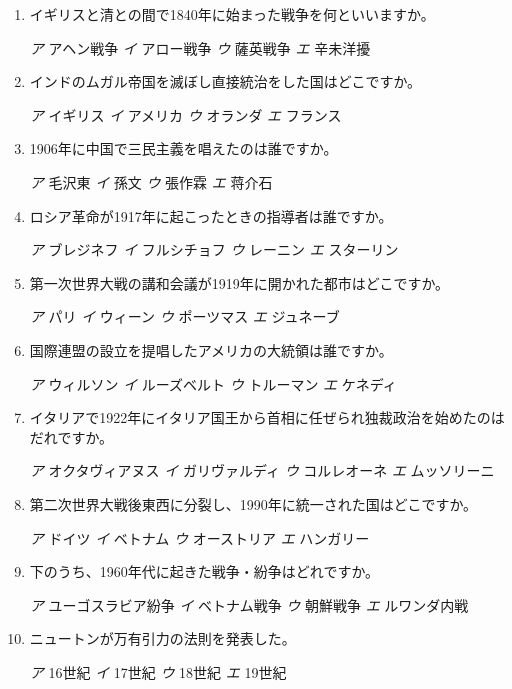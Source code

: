 \documentclass[dvipdfmx]{jsarticle}
\newcommand{\sentakusi}[4]{
\hspace{.3zw}
\emph{ア}\hspace{1zw} #1 \hspace{2zw} \emph{イ} \hspace{1zw}#2 \hspace{2zw}\emph{ウ}\hspace{1zw} #3 \hspace{2zw}\emph{エ}\hspace{1zw} #4

}
\begin{document}
\begin{enumerate}
\item イギリスと清との間で1840年に始まった戦争を何といいますか。

\sentakusi{アヘン戦争}{アロー戦争}{薩英戦争}{辛未洋擾}



\item インドのムガル帝国を滅ぼし直接統治をした国はどこですか。

\sentakusi{イギリス}{アメリカ}{オランダ}{フランス}


\item 1906年に中国で三民主義を唱えたのは誰ですか。

\sentakusi{毛沢東}{孫文}{張作霖}{蒋介石}

\item ロシア革命が1917年に起こったときの指導者は誰ですか。

  \sentakusi{ブレジネフ}{フルシチョフ}{レーニン}{スターリン}


\item 第一次世界大戦の講和会議が1919年に開かれた都市はどこですか。

\sentakusi{パリ}{ウィーン}{ポーツマス}{ジュネーブ}


\item 国際連盟の設立を提唱したアメリカの大統領は誰ですか。

\sentakusi{ウィルソン}{ルーズベルト}{トルーマン}{ケネディ}


\item イタリアで1922年にイタリア国王から首相に任ぜられ独裁政治を始めたのはだれですか。


\sentakusi{オクタヴィアヌス}{ガリヴァルディ}{コルレオーネ}{ムッソリーニ}



\item 第二次世界大戦後東西に分裂し、1990年に統一された国はどこですか。

  \sentakusi{ドイツ}{ベトナム}{オーストリア}{ハンガリー}


\item 下のうち、1960年代に起きた戦争・紛争はどれですか。

\sentakusi{ユーゴスラビア紛争}{ベトナム戦争}{朝鮮戦争}{ルワンダ内戦}

\item ニュートンが万有引力の法則を発表した。

\sentakusi{16世紀}{17世紀}{18世紀}{19世紀}


\end{enumerate}
\end{document}
